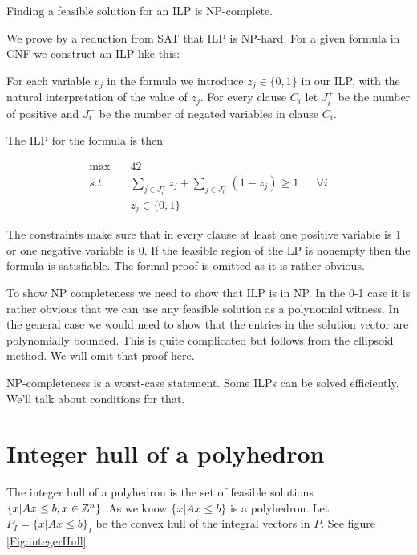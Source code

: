 \begin{thm} Finding a feasible solution for an ILP is NP-complete.
\end{thm}

\begin{pr} We prove by a reduction from SAT that ILP is NP-hard. For a given formula in CNF we construct an ILP like this:

For each variable $v_j$ in the formula we introduce $z_j \in \{0,1\}$ in our ILP, with the natural interpretation of the value of $z_j$. For every clause $C_i$ let $J^+_i$ be the number of positive and $J^-_i$ be the number of negated variables in clause $C_i$.

The ILP for the formula is then

\begin{align*}
\max \quad & 42 \\
s.t. &\sum_{j\in J^+_i} z_j + \sum_{j\in J^-_i} (1-z_j) \geq 1 && \forall i\\
&z_j \in \{0,1\}
\end{align*}

The constraints make sure that in every clause at least one positive variable is 1 or one negative variable is 0. If the feasible region of the LP is nonempty then the formula is satisfiable. The formal proof is omitted as it is rather obvious.

To show NP completeness we need to show that ILP is in NP. In the 0-1 case it is rather obvious that we can use any feasible solution as a polynomial witness. In the general case we would need to show that the entries in the solution vector are polynomially bounded. This is quite complicated but follows from the ellipsoid method. We will omit that proof here.
\end{pr}

NP-completeness is a worst-case statement. Some ILPs can be solved efficiently. We'll talk about conditions for that.

\section{Integer hull of a polyhedron}

The integer hull of a polyhedron is the set of feasible solutions $\{x | Ax\leq b, x\in \mathbb{Z}^n\}$. As we know $\{x|Ax\leq b\}$ is a polyhedron. Let $P_I = \{x| Ax\leq b\}_I$ be the convex hull of the integral vectors in $P$. See figure \ref{Fig:integerHull}


